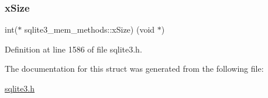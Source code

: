 \subsubsection{\texorpdfstring{x\+Size}{xSize}}
{\footnotesize\ttfamily int($\ast$ sqlite3\+\_\+mem\+\_\+methods\+::x\+Size) (void $\ast$)}



Definition at line 1586 of file sqlite3.\+h.



The documentation for this struct was generated from the following file\+:\begin{DoxyCompactItemize}
\item 
\mbox{\hyperlink{sqlite3_8h}{sqlite3.\+h}}\end{DoxyCompactItemize}
